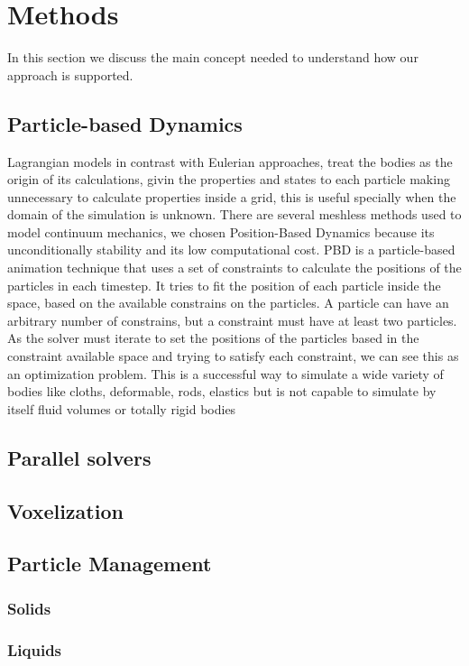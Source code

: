 \documentclass{vgtc}                          %
\begin{document}
\section{Methods}

In this section we discuss the main concept needed to understand how our approach is supported.

\subsection{Particle-based Dynamics}

Lagrangian models in contrast with Eulerian approaches, treat the bodies as the origin of its calculations, givin the properties and states to each particle making unnecessary to calculate properties inside a grid, this is useful specially when the domain of the simulation is unknown. There are several meshless methods used to model continuum mechanics, we chosen Position-Based Dynamics \cite{Muller2007} because its unconditionally stability and its low computational cost.
PBD is a particle-based animation technique that uses a set of constraints to calculate the positions of the particles in each timestep. It tries to fit the position of each particle inside the space, based on the available constrains on the particles. A particle can have an arbitrary number of constrains, but a constraint must have at least two particles. As the solver must iterate to set the positions of the particles based in the constraint available space and trying to satisfy each constraint, we can see this as an optimization problem. This is a successful way to simulate a wide variety of bodies like cloths, deformable, rods, elastics but is not capable to simulate by itself fluid volumes or totally rigid bodies
\subsection{Parallel solvers}
\subsection{Voxelization}
\subsection{Particle Management}
\subsubsection{Solids}
\subsubsection{Liquids}
\end{document}
